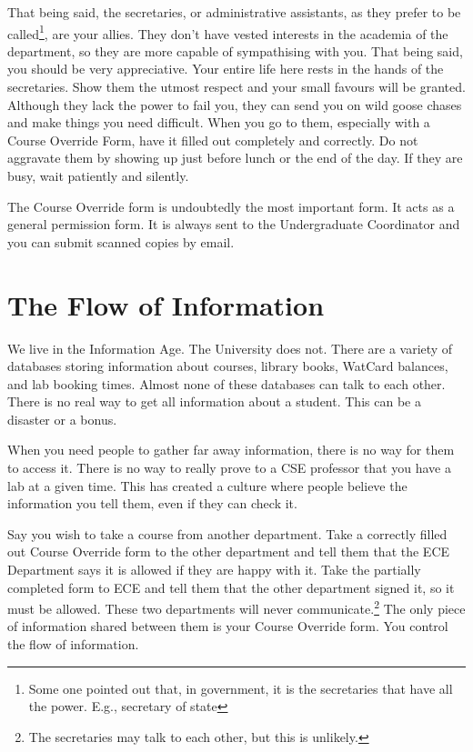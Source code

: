 \documentclass{book}
\begin{document}
That being said, the secretaries, or administrative assistants, as they prefer to be called\footnote{Some one pointed out that, in government, it is the secretaries that have all the power. E.g., secretary of state}, are your allies. They don't have vested interests in the academia of the department, so they are more capable of sympathising with you. That being said, you should be very appreciative. Your entire life here rests in the hands of the secretaries. Show them the utmost respect and your small favours will be granted. Although they lack the power to fail you, they can send you on wild goose chases and make things you need difficult. When you go to them, especially with a Course Override Form, have it filled out completely and correctly. Do not aggravate them by showing up just before lunch or the end of the day. If they are busy, wait patiently and silently.

The Course Override form is undoubtedly the most important form. It acts as a general permission form. It is always sent to the Undergraduate Coordinator and you can submit scanned copies by email.

\section{The Flow of Information}
We live in the Information Age. The University does not. There are a variety of databases storing information about courses, library books, WatCard balances, and lab booking times. Almost none of these databases can talk to each other. There is no real way to get all information about a student. This can be a disaster or a bonus.

When you need people to gather far away information, there is no way for them to access it. There is no way to really prove to a CSE professor that you have a lab at a given time. This has created a culture where people believe the information you tell them, even if they can check it.

Say you wish to take a course from another department. Take a correctly filled out Course Override form to the other department and tell them that the ECE Department says it is allowed if they are happy with it. Take the partially completed form to ECE and tell them that the other department signed it, so it must be allowed. These two departments will never communicate.\footnote{The secretaries may talk to each other, but this is unlikely.} The only piece of information shared between them is your Course Override form. You control the flow of information.
\end{document}
